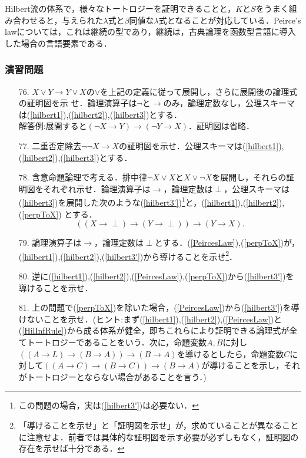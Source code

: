 \documentclass{ltjsarticle}
\theoremstyle{mystyle1}
\theoremstyle{mystyle2}
\begin{document}
Hilbert流の体系で，様々なトートロジーを証明できることと，$K$と$S$をうまく組み合わせると，与えられた$\lambda$式と$\beta$同値な$\lambda$式となることが対応している．Peirce's lawについては，これは継続の型であり，継続は，古典論理を函数型言語に導入した場合の言語要素である．
\subsubsection*{演習問題}
\begin{enumerate}
  \item[76.] $X\vee Y\to Y\vee X$の$\vee$を上記の定義に従って展開し，さらに展開後の論理式の証明図を示 せ．論理演算子は$\neg$と$\to$のみ，論理定数なし，公理スキーマは(\ref{hilbert1}),(\ref{hilbert2}),(\ref{hilbert3})とする．\\解答例:展開すると$\left(\neg X\to Y\right)\to\left(\neg Y\to X\right)$．証明図は省略．
  \item[77.] 二重否定除去$\neg\neg X\to X$の証明図を示せ．公理スキーマは(\ref{hilbert1}),(\ref{hilbert2}),(\ref{hilbert3})とする．
  \item[78.] 含意命題論理で考える．排中律$\neg X\vee X$と$X\vee\neg X$を展開し，それらの証明図をそれぞれ示せ．論理演算子は$\to$，論理定数は$\perp$，公理スキーマは(\ref{hilbert3})を展開した次のような(\ref{hilbert3'})\footnote{この問題の場合，実は(\ref{hilbert3'})は必要ない．}と，(\ref{hilbert1}),(\ref{hilbert2}),(\ref{perpToX}) とする．
        \begin{equation}
          \left(\left(X\to\perp\right)\to\left(Y\to\perp\right)\right)\to\left(Y\to X\right).\tag{15'}\label{hilbert3'}
        \end{equation}
  \item[79.] 論理演算子は$\to$，論理定数は$\perp$とする．(\ref{PeircesLaw}),(\ref{perpToX})が，(\ref{hilbert1}),(\ref{hilbert2}),(\ref{hilbert3'})から導けることを示せ\footnote{「導けることを示せ」と「証明図を示せ」が，求めていることが異なることに注意せよ．前者では具体的な証明図を示す必要が必ずしもなく，証明図の存在を示せば十分である．}．
  \item[80.] 逆に(\ref{hilbert1}),(\ref{hilbert2}),(\ref{PeircesLaw}),(\ref{perpToX})から(\ref{hilbert3'})を導けることを示せ．
  \item[81.] 上の問題で(\ref{perpToX})を除いた場合，(\ref{PeircesLaw})から(\ref{hilbert3'})を導けないことを示せ．(ヒント:まず(\ref{hilbert1}),(\ref{hilbert2}),(\ref{PeircesLaw})と(\ref{HilInfRule})から成る体系が健全，即ちこれらにより証明できる論理式が全てトートロジーであることをいう．次に，命題変数$A, B$に対し$\left(\left(A\to L\right)\to\left(B\to A\right)\right)\to\left(B\to A\right)$を導けるとしたら，命題変数$C$に対して$\left(\left(A\to C\right)\to\left(B\to C\right)\right)\to\left(B\to A\right)$が導けることを示し，それがトートロジーとならない場合があることを言う．)
\end{enumerate}
\end{document}
